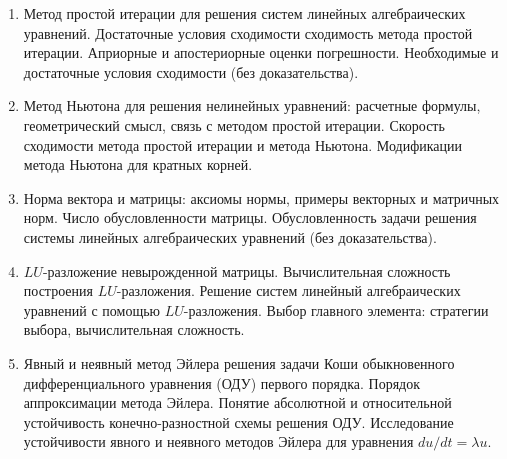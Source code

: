 % 
%

\begin{enumerate}
\item Метод простой итерации для решения систем линейных алгебраических уравнений. Достаточные условия сходимости сходимость метода простой итерации. Априорные и апостериорные оценки погрешности. Необходимые и достаточные условия сходимости (без доказательства).

\item Метод Ньютона для решения нелинейных уравнений: расчетные формулы, геометрический смысл, связь  с методом простой итерации. Скорость сходимости метода простой итерации  и метода Ньютона. Модификации метода Ньютона для кратных корней.

\item Норма вектора и матрицы: аксиомы нормы, примеры векторных и матричных норм. Число обусловленности матрицы. Обусловленность задачи решения системы линейных алгебраических уравнений (без доказательства).

\item $LU$-разложение невырожденной матрицы. Вычислительная сложность построения $LU$-разложения. Решение систем линейный алгебраических уравнений с помощью $LU$-разложения. Выбор главного элемента: стратегии выбора, вычислительная сложность.  


\item Явный и неявный метод Эйлера решения задачи Коши обыкновенного дифференциального уравнения (ОДУ) первого порядка. Порядок аппроксимации метода Эйлера. Понятие абсолютной и относительной устойчивость конечно-разностной схемы решения ОДУ. Исследование устойчивости явного и неявного методов Эйлера для уравнения $du/dt = \lambda u$.

\end{enumerate}
